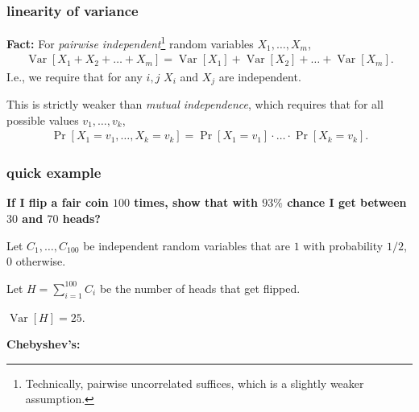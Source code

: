 \documentclass[handout,compress]{beamer}
\newcommand{\E}{\mathbb{E}}
\DeclareMathOperator{\Var}{Var}
\begin{document}
\begin{frame}
	\frametitle{linearity of variance}
	\textbf{Fact:} For \emph{pairwise independent}\footnote{Technically, pairwise uncorrelated suffices, which is a slightly weaker assumption.} random variables $X_1, \ldots, X_m$, 
	\begin{align*}
		\Var[X_1 + X_2 + \ldots + X_m] = 	\Var[X_1]+ \Var[X_2] + \ldots + \Var[X_m]. 
	\end{align*}
I.e., we require that for any $i,j$ $X_i$ and $X_j$ are independent. 

This is strictly weaker than \emph{mutual independence}, which requires that for all possible values $v_1, \ldots, v_k$,
\begin{align*}
	\Pr[X_1 = v_1, \ldots, X_k = v_k] = 	\Pr[X_1 = v_1]\cdot\ldots \cdot\Pr[X_k = v_k].
\end{align*}
\end{frame}

\begin{frame}
	\frametitle{quick example}
	\begin{center}
		\textbf{If I flip a fair coin $100$ times, show that with $93\%$ chance I get between $30$ and $70$ heads?}
	\end{center}
	Let $C_1, \ldots, C_{100}$ be independent random variables that are $1$ with probability $1/2$, $0$ otherwise.
	
	Let $H = \sum_{i=1}^{100} C_i$ be the number of heads that get flipped.	
	
	$\Var[H] = 25$.  
	
	\textbf{Chebyshev's:}

	\vspace{4em}
\end{frame}

%	
%	
%	
%	
\end{document}
